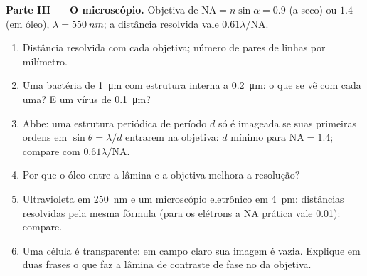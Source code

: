 \begin{problem}
\medskip
\noindent\textbf{Parte III --- O microscópio.}
Objetiva de  $\mathrm{NA} = n\sin\alpha = 0.9$ (a seco) ou $1.4$
(em óleo), $\lambda = \qty{550}{nm}$; a distância resolvida vale $0.61\lambda/\mathrm{NA}$.
\begin{enumerate}[resume]
  \item Distância resolvida com cada objetiva; número de pares de linhas
        por milímetro.
  \item Uma bactéria de \qty{1}{\micro m} com estrutura interna a
        \qty{0.2}{\micro m}: o que se vê com cada uma? E um vírus de \qty{0.1}{\micro m}?
  \item Abbe: uma estrutura periódica de período $d$ só é imageada se suas
        primeiras ordens em $\sin\theta = \lambda/d$ entrarem na objetiva: $d$ mínimo
        para $\mathrm{NA} = 1.4$; compare com $0.61\lambda/\mathrm{NA}$.
  \item Por que o óleo entre a lâmina e a objetiva melhora a
        resolução?
  \item Ultravioleta em \qty{250}{nm} e um microscópio eletrônico em \qty{4}{pm}:
        distâncias resolvidas pela mesma fórmula (para os elétrons a
        NA prática vale \qty{0.01}{}): compare.
  \item Uma célula é transparente: em campo claro sua imagem é vazia.
        Explique em duas frases o que faz a lâmina de contraste de fase no
         da objetiva.
\end{enumerate}


\end{problem}

